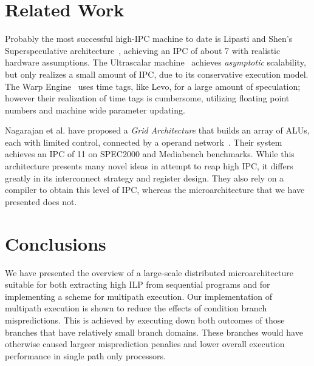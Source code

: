 \documentclass[10pt,dvips]{article}
\begin{document}
\section{Related Work}
%
Probably the most successful high-IPC machine to date is
Lipasti and Shen's Superspeculative
architecture~\cite{Lip97}, achieving an IPC of
about 7 with realistic hardware assumptions.
The Ultrascalar machine~\cite{Hen00}
achieves {\em asymptotic} scalability,
but only realizes a small amount of IPC,
due to its conservative execution model.
The Warp Engine~\cite{Cle95}
uses time tags, like Levo, for a large amount of speculation;
however their realization of time
tags is cumbersome, utilizing floating point
numbers and machine wide parameter updating.

Nagarajan et al. have proposed a {\em Grid Architecture} that
builds an array of ALUs, each with limited control, connected
by a operand network~\cite{Nag01}.  Their system achieves an IPC of 11 on
SPEC2000 and Mediabench benchmarks.  While this architecture
presents many novel ideas in attempt to reap high IPC, it
differs greatly in its interconnect strategy and register design.
They also rely on a compiler to obtain this level of IPC, whereas
the microarchitecture that we have presented does not.
%
\section{Conclusions}
%
We have presented the overview of a large-scale distributed 
microarchitecture suitable for both extracting high ILP from
sequential programs and for implementing a scheme for
multipath execution.
Our implementation of multipath execution is shown to reduce
the effects of condition branch mispredictions.
This is achieved by executing down both outcomes of those
branches that have relatively small branch domains.  These branches
would have otherwise caused largeer misprediction penalies and lower
overall execution performance in single
path only processors.



\end{document}
